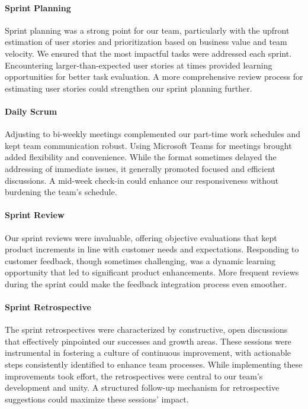 \paragraph{Sprint Planning}
Sprint planning was a strong point for our team, particularly with the upfront estimation of user stories and prioritization based on business value and team velocity.
We ensured that the most impactful tasks were addressed each sprint.
Encountering larger-than-expected user stories at times provided learning opportunities for better task evaluation.
A more comprehensive review process for estimating user stories could strengthen our sprint planning further.

\paragraph{Daily Scrum}
Adjusting to bi-weekly meetings complemented our part-time work schedules and kept team communication robust.
Using Microsoft Teams for meetings brought added flexibility and convenience.
While the format sometimes delayed the addressing of immediate issues, it generally promoted focused and efficient discussions.
A mid-week check-in could enhance our responsiveness without burdening the team's schedule.

\paragraph{Sprint Review}
Our sprint reviews were invaluable, offering objective evaluations that kept product increments in line with customer needs and expectations.
Responding to customer feedback, though sometimes challenging, was a dynamic learning opportunity that led to significant product enhancements.
More frequent reviews during the sprint could make the feedback integration process even smoother.

\paragraph{Sprint Retrospective}
The sprint retrospectives were characterized by constructive, open discussions that effectively pinpointed our successes and growth areas.
These sessions were instrumental in fostering a culture of continuous improvement, with actionable steps consistently identified to enhance team processes.
While implementing these improvements took effort, the retrospectives were central to our team's development and unity.
A structured follow-up mechanism for retrospective suggestions could maximize these sessions' impact.

